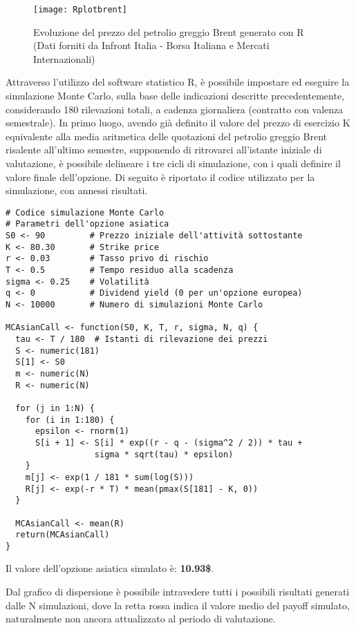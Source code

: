 \documentclass[12pt,a4paper]{report}
\begin{document}
\begin{figure}
     [ht]
    \centering
    \texttt{[image: Rplotbrent]}
    \caption{Evoluzione del prezzo del petrolio greggio Brent generato con R (Dati forniti da Infront Italia - Borsa Italiana e Mercati Internazionali)}
    \label{fig:enter-label10}
\end{figure}


Attraverso l'utilizzo del software statistico R, è possibile impostare ed eseguire la simulazione Monte Carlo, sulla base delle indicazioni descritte precedentemente, considerando 180 rilevazioni totali, a cadenza giornaliera (contratto con valenza semestrale). In primo luogo, avendo già definito il valore del prezzo di esercizio K equivalente alla media aritmetica delle quotazioni del petrolio greggio Brent risalente all'ultimo semestre, supponendo di ritrovarci all'istante iniziale di valutazione, è possibile delineare i tre cicli di simulazione, con i quali definire il valore finale dell'opzione. Di seguito è riportato il codice utilizzato per la simulazione, con annessi risultati.


\begin{verbatim}
# Codice simulazione Monte Carlo
# Parametri dell'opzione asiatica
S0 <- 90         # Prezzo iniziale dell'attività sottostante
K <- 80.30       # Strike price
r <- 0.03        # Tasso privo di rischio
T <- 0.5         # Tempo residuo alla scadenza
sigma <- 0.25    # Volatilità
q <- 0           # Dividend yield (0 per un'opzione europea)
N <- 10000       # Numero di simulazioni Monte Carlo

MCAsianCall <- function(S0, K, T, r, sigma, N, q) {
  tau <- T / 180  # Istanti di rilevazione dei prezzi
  S <- numeric(181)
  S[1] <- S0
  m <- numeric(N)
  R <- numeric(N)
  
  for (j in 1:N) {
    for (i in 1:180) {
      epsilon <- rnorm(1)
      S[i + 1] <- S[i] * exp((r - q - (sigma^2 / 2)) * tau + 
                  sigma * sqrt(tau) * epsilon)
    }
    m[j] <- exp(1 / 181 * sum(log(S)))
    R[j] <- exp(-r * T) * mean(pmax(S[181] - K, 0))
  }
  
  MCAsianCall <- mean(R)
  return(MCAsianCall)
}
\end{verbatim}

Il valore dell'opzione asiatica simulato è: \textbf{10.93\$}. 

Dal grafico di dispersione è possibile intravedere tutti i possibili risultati generati dalle N simulazioni, dove la retta rossa indica il valore medio del payoff simulato, naturalmente non ancora attualizzato al periodo di valutazione.
\end{document}
